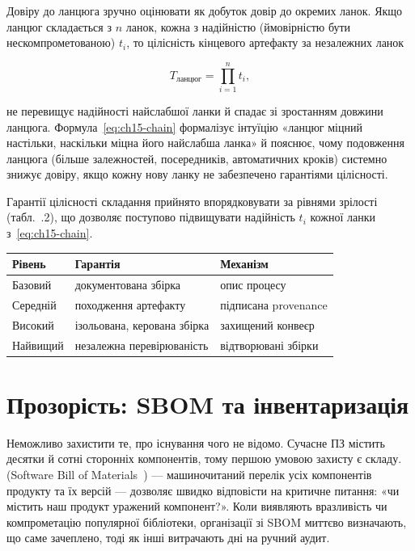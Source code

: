 Довіру до ланцюга зручно оцінювати як добуток довір до окремих ланок. Якщо ланцюг складається з $n$ ланок, кожна з надійністю (ймовірністю бути нескомпрометованою) $t_i$, то цілісність кінцевого артефакту за незалежних ланок

\begin{equation}
T_{\text{ланцюг}} = \prod_{i=1}^{n} t_i,
\label{eq:ch15-chain}
\end{equation}

не перевищує надійності найслабшої ланки й спадає зі зростанням довжини ланцюга. Формула~\eqref{eq:ch15-chain} формалізує інтуїцію «ланцюг міцний настільки, наскільки міцна його найслабша ланка» й пояснює, чому подовження ланцюга (більше залежностей, посередників, автоматичних кроків) системно знижує довіру, якщо кожну нову ланку не забезпечено гарантіями цілісності.

Гарантії цілісності складання прийнято впорядковувати за рівнями зрілості (табл.~\thechapter.2), що дозволяє поступово підвищувати надійність $t_i$ кожної ланки з~\eqref{eq:ch15-chain}.


\begin{center}\footnotesize
\begin{tabularx}{\linewidth}{L{14mm} Y L{20mm}}
\toprule
Рівень & Гарантія & Механізм \\
\midrule
Базовий & документована збірка & опис процесу \\
Середній & походження артефакту & підписана provenance \\
Високий & ізольована, керована збірка & захищений конвеєр \\
Найвищий & незалежна перевірюваність & відтворювані збірки \\
\bottomrule
\end{tabularx}
\end{center}

\section{Прозорість: SBOM та інвентаризація}\label{sec:ch15-sbom}

Неможливо захистити те, про існування чого не відомо. Сучасне ПЗ містить десятки й сотні сторонніх компонентів, тому першою умовою захисту є  складу.  (Software Bill of Materials~\cite{ch15:sbom}) --- машиночитаний перелік усіх компонентів продукту та їх версій --- дозволяє швидко відповісти на критичне питання: «чи містить наш продукт уражений компонент?». Коли виявляють вразливість чи компрометацію популярної бібліотеки, організації зі SBOM миттєво визначають, що саме зачеплено, тоді як інші витрачають дні на ручний аудит.

